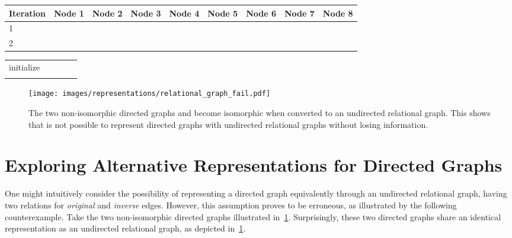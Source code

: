 \documentclass{article}
\theoremstyle{plain}
\theoremstyle{definition}
\theoremstyle{remark}
\begin{document}
\begin{table*}[t]
\begin{center}
\begin{small}
\begin{sc}
\begin{tabular}{l||cccc|cccc}
\toprule
Iteration     & Node 1  & Node 2 & Node 3 & Node 4 & Node 5  & Node 6 & Node 7 & Node 8 \\
\midrule
1             &        &       &       &       &        &       &       &       \\
2             &        &       &       &       &        &       &       &       \\
\bottomrule
\end{tabular}

\begin{tabular}{lcccr}
\toprule
                                                      &    \\
\midrule
initialize                                                  &                           \\
             &                           \\
\bottomrule
\end{tabular}

\end{sc}
\end{small}
\end{center}
\caption{Node colorings at different iterations, as well as the  hash function, when applying U-WL to the two graphs in~\cref{fig:mpnn-u_fails}.}
\label{tab:wl-u}
\end{table*}




  
\begin{figure}
    \centering
    \texttt{[image: images/representations/relational\_graph\_fail.pdf]}
    \caption{The two non-isomorphic directed graphs  and  become isomorphic when converted to an undirected relational graph. This shows that is not possible to represent directed graphs with undirected relational graphs without losing information.}
    \label{fig:relational_graph_fail}
\end{figure}

\section{Exploring Alternative Representations for Directed Graphs} \label{sec:alternative_representations}
One might intuitively consider the possibility of representing a directed graph equivalently through an undirected relational graph, having two relations for \textit{original} and \textit{inverse} edges. However, this assumption proves to be erroneous, as illustrated by the following counterexample. Take the two non-isomorphic directed graphs illustrated in~\cref{fig:relational_graph_fail}. Surprisingly, these two directed graphs share an identical representation as an undirected relational graph, as depicted in~\cref{fig:relational_graph_fail}. 
\end{document}

